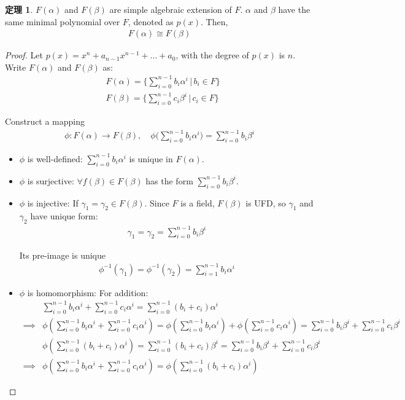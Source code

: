 \documentclass[utf8]{ctexbook}
\theoremstyle{definition}
\newtheorem{prototheorem}{定理}[section]
\newenvironment{theorem}
   {\colorlet{shadecolor}{pink!30}\begin{shaded}\begin{prototheorem}}
   {\end{prototheorem}\end{shaded}}
\begin{document}
\begin{theorem}
\label{theorem_4_2_iso_simple_alge_extension}
$F(\alpha)$ and $F(\beta)$ are simple algebraic extension of $F$. $\alpha$ and $\beta$ have the same minimal polynomial over $F$, denoted as $p(x)$. Then, 
\begin{align*}
F(\alpha) \cong F(\beta)
\end{align*}
\end{theorem}


\begin{proof}
Let $p(x) = x^n + a_{n-1} x^{n-1} + \ldots + a_0$, with the degree of $p(x)$ is $n$. Write $F(\alpha)$ and $F(\beta)$ as:
\begin{align*}
& F(\alpha) = \{ \sum_{i=0}^{n-1} b_i \alpha^i \, | \, b_i \in F \} \\
& F(\beta) = \{ \sum_{i=0}^{n-1} c_i \beta^i \, | \, c_i \in F \} 
\end{align*}

Construct a mapping
\begin{align*}
\phi: F(\alpha) \longrightarrow F(\beta), \quad \phi\Big(\sum_{i=0}^{n-1} b_i \alpha^i \Big) = \sum_{i=0}^{n-1} b_i \beta^i
\end{align*}

\begin{itemize}
\item{$\phi$ is well-defined: $\sum_{i=0}^{n-1} b_i \alpha^i $ is unique in $F(\alpha)$.}
\item{$\phi$ is surjective: $\forall f(\beta) \in F(\beta)$ has the form $\sum_{i=0}^{n-1} b_i \beta^i$.}
\item{$\phi$ is injective: If $\gamma_1 = \gamma_2 \in F(\beta)$. Since $F$ is a field, $F(\beta)$ is UFD, so $\gamma_1 $ and $\gamma_2$ have unique form:
\begin{align*}
\gamma_1 = \gamma_2 = \sum_{i=0}^{n-1} b_i \beta^i
\end{align*}

Its pre-image is unique
\begin{align*}
\phi^{-1} (\gamma_1 ) = \phi^{-1} (\gamma_2) = \sum_{i=1} ^{n-1} b_i \alpha^i
\end{align*}
}
\item{$\phi$ is homomorphism: 
For addition:
\begin{align*}
& \sum_{i=0}^{n-1} b_i \alpha^i + \sum_{i=0}^{n-1} c_i \alpha^i = \sum_{i=0}^{n-1} (b_i+ c_i) \alpha^i \\
\implies & \phi(\sum_{i=0}^{n-1} b_i \alpha^i + \sum_{i=0}^{n-1} c_i \alpha^i ) = \phi(\sum_{i=0}^{n-1} b_i \alpha^i) + \phi( \sum_{i=0}^{n-1} c_i \alpha^i ) 
= \sum_{i=0}^{n-1} b_i \beta^i + \sum_{i=0}^{n-1} c_i \beta^i \\
 & \phi( \sum_{i=0}^{n-1} (b_i+ c_i) \alpha^i) = \sum_{i=0}^{n-1} (b_i+ c_i) \beta^i 
 = \sum_{i=0}^{n-1} b_i \beta^i + \sum_{i=0}^{n-1} c_i \beta^i \\
 \implies & \phi(\sum_{i=0}^{n-1} b_i \alpha^i + \sum_{i=0}^{n-1} c_i \alpha^i )  = \phi( \sum_{i=0}^{n-1} (b_i+ c_i) \alpha^i) 
\end{align*}

}
\end{itemize}
\end{proof}
\end{document}
